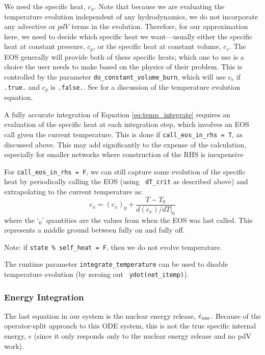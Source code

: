 We need the specific heat, $c_x$.  Note that because we are evaluating
the temperature evolution independent of any hydrodynamics, we do not
incorporate any advective or $pdV$ terms in the evolution.  Therefore,
for our approximation here, we need to decide which specific heat we
want---usually either the specific heat at constant pressure, $c_p$,
or the specific heat at constant volume, $c_v$.  The EOS generally
will provide both of these specific heats; which one to use is a
choice the user needs to make based on the physics of their problem.
This is controlled by the parameter {\tt do\_constant\_volume\_burn},
which will use $c_v$ if {\tt .true.}  and $c_p$ is {\tt .false.}.  See
\cite{maestro:III} for a discussion of the temperature evolution
equation.

A fully accurate integration of Equation \ref{eq:temp_integrate}
requires an evaluation of the specific heat at each integration step,
which involves an EOS call given the current temperature.  This is done
if {\tt call\_eos\_in\_rhs = T}, as discussed above.
This may add significantly to the expense of the calculation,
especially for smaller networks where construction of the RHS is
inexpensive

For {\tt call\_eos\_in\_rhs = F}, we can still capture some evolution
of the specific heat by periodically calling the EOS (using {\tt
  dT\_crit} as described above) and extrapolating to the current
temperature as:
\begin{equation}
  c_x = (c_x)_0 + \frac{T - T_0}{d(c_x)/dT|_0}
\end{equation}
where the `$_0$' quantities are the values from when the EOS was last
called.  This represents a middle ground between fully on and fully
off.

Note: if {\tt state \% self\_heat = F}, then we do not evolve
temperature.


The runtime parameter {\tt integrate\_temperature} can be used to
disable temperature evolution (by zeroing out {\tt
  ydot(net\_itemp)}). 


\subsubsection{Energy Integration}

The last equation in our system is the nuclear energy release,
${{\dot{e}_\mathrm{nuc}}}$.  Because of the operator-split approach to this ODE system,
this is not the true specific internal energy, $e$ (since it only
responds only to the nuclear energy release and no pdV work).

